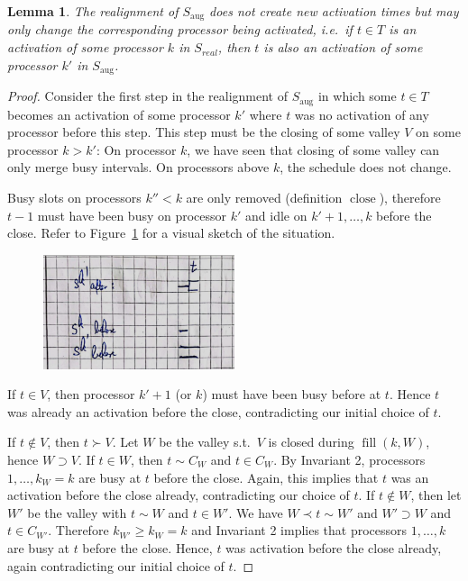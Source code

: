 \documentclass[a4paper]{article}
\DeclareMathOperator{\aug}{aug}
\DeclareMathOperator{\fillop}{fill}
\DeclareMathOperator{\close}{close}
\newtheorem{lemma}[theorem]{Lemma}
\begin{document}
\begin{lemma}\label{lemma:activations}
  The realignment of $S_{\aug}$ does not create new activation times but may only change the corresponding processor being activated, i.e.\ if $t \in T$ is an activation of some processor $k$ in $S_{real}$, then $t$ is also an activation of some processor $k'$ in $S_{\aug}$.
\end{lemma}
\begin{proof}
  Consider the first step in the realignment of $S_{\aug}$ in which some $t \in T$ becomes an activation of some processor $k'$ where $t$ was no activation of any processor before this step.
  This step must be the closing of some valley $V$ on some processor $k > k'$:
  On processor $k$, we have seen that closing of some valley can only merge busy intervals.
  On processors above $k$, the schedule does not change.

  Busy slots on processors $k'' < k$ are only removed (definition $\close$), therefore $t-1$ must have been busy on processor $k'$ and idle on $k' + 1, \ldots, k$ before the close.
  Refer to Figure~\ref{fig:activations} for a visual sketch of the situation.

  \begin{figure}[H]
    \centering
    \includegraphics[width=0.5\textwidth]{graphics/sketches/activations.png}\label{fig:activations}
    \caption{}
  \end{figure}

  If $t \in V$, then processor $k' + 1$ (or $k$) must have been busy before at $t$.
  Hence $t$ was already an activation before the close, contradicting our initial choice of $t$.

  If $t \notin V$, then $t \succ V$.
  Let $W$ be the valley s.t.\ $V$ is closed during $\fillop(k, W)$, hence $W \supset V$.
  If $t \in W$, then $t \sim C_W$ and $t \in C_W$.
  By Invariant 2, processors $1, \ldots, k_W = k$ are busy at $t$ before the close.
  Again, this implies that $t$ was an activation before the close already, contradicting our choice of $t$.
  If $t \notin W$, then let $W'$ be the valley with $t \sim W$ and $t \in W'$.
  We have $W \prec t \sim W'$ and $W' \supset W$ and $t \in C_{W'}$.
  Therefore $k_{W'} \geq k_W = k$ and Invariant 2 implies that processors $1, \ldots, k$ are busy at $t$ before the close.
  Hence, $t$ was activation before the close already, again contradicting our initial choice of $t$.
\end{proof}
\end{document}

